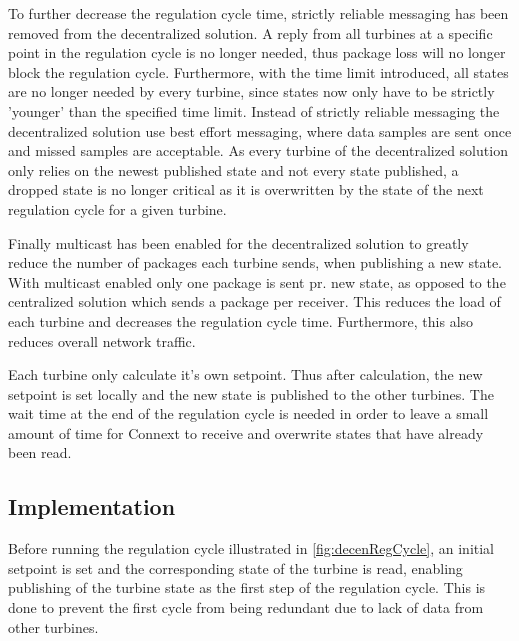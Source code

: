 To further decrease the regulation cycle time, strictly reliable messaging has been removed from the decentralized solution. A reply from all turbines at a specific point in the regulation cycle is no longer needed, thus package loss will no longer block the regulation cycle. Furthermore, with the time limit introduced, all states are no longer needed by every turbine, since states now only have to be strictly 'younger' than the specified time limit.
Instead of strictly reliable messaging the decentralized solution use best effort messaging, where data samples are sent once and missed samples are acceptable. As every turbine of the decentralized solution only relies on the newest published state and not every state published, a dropped state is no longer critical as it is overwritten by the state of the next regulation cycle for a given turbine.

Finally multicast has been enabled for the decentralized solution to greatly reduce the number of packages each turbine sends, when publishing a new state. With multicast enabled only one package is sent pr. new state, as opposed to the centralized solution which sends a package per receiver. This reduces the load of each turbine and decreases the regulation cycle time. Furthermore, this also reduces overall network traffic.  

Each turbine only calculate it's own setpoint. Thus after calculation, the new setpoint is set locally and the new state is published to the other turbines. The wait time at the end of the regulation cycle is needed in order to leave a small amount of time for Connext to receive and overwrite states that have already been read.

\subsection{Implementation}

Before running the regulation cycle illustrated in \cref{fig:decenRegCycle}, an initial setpoint is set and the corresponding state of the turbine is read, enabling publishing of the turbine state as the first step of the regulation cycle. This is done to prevent the first cycle from being redundant due to lack of data from other turbines. 


